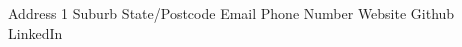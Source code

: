 
\contact
{Address 1}
{Suburb}
{State/Postcode}
{Email}
{Phone Number}
{Website}
{Github}
{LinkedIn}
